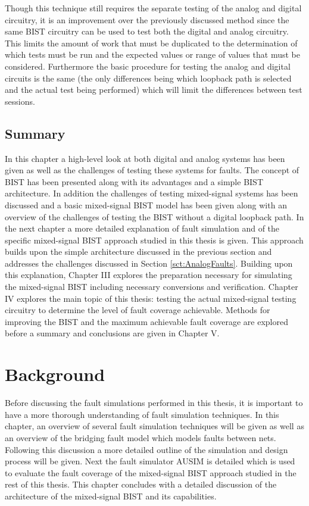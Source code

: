 \documentclass[12pt]{report}
\begin{document}
Though this technique still requires the separate testing of the analog and digital circuitry, it is an improvement over the previously discussed method since the same BIST circuitry can be used to test both the digital and analog circuitry\cite{stroud}.  This limits the amount of work that must be duplicated to the determination of which tests must be run and the expected values or range of values that must be considered.  Furthermore the basic procedure for testing the analog and digital circuits is the same (the only differences being which loopback path is selected and the actual test being performed) which will limit the differences between test sessions.

\section{Summary}
In this chapter a high-level look at both digital and analog systems has been given as well as the challenges of testing these systems for faults.  The concept of BIST has been presented along with its advantages and a simple BIST architecture.  In addition the challenges of testing mixed-signal systems has been discussed and a basic mixed-signal BIST model has been given along with an overview of the challenges of testing the BIST without a digital loopback path.  In the next chapter a more detailed explanation of fault simulation and of the specific mixed-signal BIST approach studied in this thesis is given.  This approach builds upon the simple architecture discussed in the previous section and addresses the challenges discussed in Section \ref{sct:AnalogFaults}.  Building upon this explanation, Chapter III explores the preparation necessary for simulating the mixed-signal BIST including necessary conversions and verification.  Chapter IV explores the main topic of this thesis: testing the actual mixed-signal testing circuitry to determine the level of fault coverage achievable.  Methods for improving the BIST and the maximum achievable fault coverage are explored before a summary and conclusions are given in Chapter V.

\chapter{Background}
Before discussing the fault simulations performed in this thesis, it is important to have a more thorough understanding of fault simulation techniques.  In this chapter, an overview of several fault simulation techniques will be given as well as an overview of the bridging fault model which models faults between nets.  Following this discussion a more detailed outline of the simulation and design process will be given.  Next the fault simulator AUSIM is detailed which is used to evaluate the fault coverage of the mixed-signal BIST approach studied in the rest of this thesis.  This chapter concludes with a detailed discussion of the architecture of the mixed-signal BIST and its capabilities.
\end{document}
